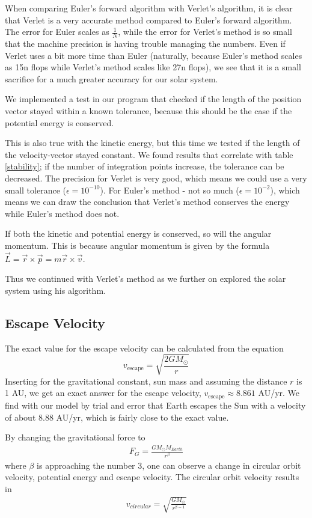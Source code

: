 \documentclass{article}
\begin{document}
When comparing Euler's forward algorithm with Verlet's algorithm, it is clear that Verlet is a very accurate method compared to Euler's forward algorithm. The error for Euler scales as $\frac{1}{N}$, while the error for Verlet's method is so small that the machine precision is having trouble managing the numbers. Even if Verlet uses a bit more time than Euler (naturally, because Euler's method scales as 15n flops while Verlet's method scales like 27n flops), we see that it is a small sacrifice for a much greater accuracy for our solar system.

We implemented a test in our program that checked if the length of the position vector stayed within a known tolerance, because this should be the case if the potential energy is conserved.

This is also true with the kinetic energy, but this time we tested if the length of the velocity-vector stayed constant. We found results that correlate with table \ref{stability}; if the number of integration points increase, the tolerance can be decreased. The precision for Verlet is very good, which means we could use a very small tolerance ($\epsilon = 10^{-10}$). For Euler's method - not so much ($\epsilon = 10^{-2}$), which means we can draw the conclusion that Verlet's method conserves the energy while Euler's method does not.

If both the kinetic and potential energy is conserved, so will the angular momentum. This is because angular momentum is given by the formula $\vec{L}=\vec{r} \times \vec{p} =m \vec{r} \times \vec{v}$.


Thus we continued with Verlet's method as we further on explored the solar system using his algorithm.

\subsection{Escape Velocity}
The exact value for the escape velocity can be calculated from the equation
$$v_{\mathrm{escape}}=\sqrt{\frac{2GM_{\odot}}{r}}$$
Inserting for the gravitational constant, sun mass and assuming the distance $r$ is 1 AU, we get an exact answer for the escape velocity, $v_{\mathrm{escape}}\approx 8.861$ AU/yr. We find with our model by trial and error that Earth escapes the Sun with a velocity of about $8.88$ AU/yr, which is fairly close to the exact value.

By changing the gravitational force to
\begin{align*}
  F_G = \frac{GM_{\odot}M_{Earth}}{r^{\beta}}
\end{align*}
where $\beta$ is approaching the number $3$, one can observe a change in circular orbit velocity, potential energy and escape velocity. The circular orbit velocity results in
\begin{align*}
  v_{circular}=\sqrt{\frac{GM_{\odot}}{r^{\beta-1}}}
\end{align*}
\end{document}
